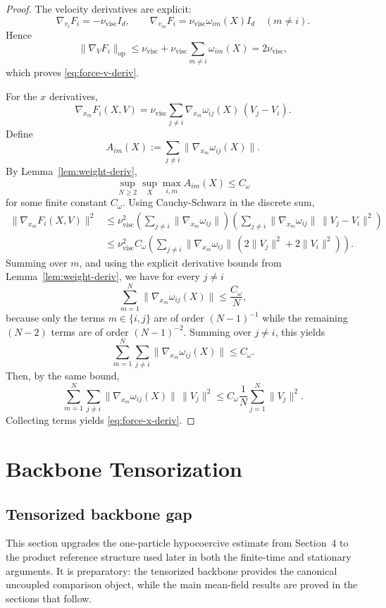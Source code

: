 \documentclass[11pt]{article}
\theoremstyle{definition}
\theoremstyle{remark}
\begin{document}
\begin{proof}
The velocity derivatives are explicit:
\[
\nabla_{v_i}F_i=-\nu_{\mathrm{visc}}I_d,
\qquad
\nabla_{v_m}F_i=
\nu_{\mathrm{visc}}\omega_{im}(X)I_d
\quad(m\neq i).
\]
Hence
\[
\|\nabla_V F_i\|_{\mathrm{op}}
\leq
\nu_{\mathrm{visc}}
+\nu_{\mathrm{visc}}\sum_{m\neq i}\omega_{im}(X)
=
2\nu_{\mathrm{visc}},
\]
which proves \eqref{eq:force-v-deriv}.

For the $x$ derivatives,
\[
\nabla_{x_m}F_i(X,V)
=
\nu_{\mathrm{visc}}\sum_{j\neq i}\nabla_{x_m}\omega_{ij}(X)\,(V_j-V_i).
\]
Define
\[
A_{im}(X):=\sum_{j\neq i}\|\nabla_{x_m}\omega_{ij}(X)\|.
\]
By Lemma~\ref{lem:weight-deriv},
\[
\sup_{N\geq2}\sup_X \max_{i,m} A_{im}(X)\leq C_\omega
\]
for some finite constant $C_\omega$. Using Cauchy-Schwarz in the discrete sum,
\begin{align*}
\|\nabla_{x_m}F_i(X,V)\|^2
&\leq
\nu_{\mathrm{visc}}^2
\left(\sum_{j\neq i}\|\nabla_{x_m}\omega_{ij}\|\right)
\left(\sum_{j\neq i}\|\nabla_{x_m}\omega_{ij}\|\,\|V_j-V_i\|^2\right)\\
&\leq
\nu_{\mathrm{visc}}^2 C_\omega
\left(\sum_{j\neq i}\|\nabla_{x_m}\omega_{ij}\|\,(2\|V_j\|^2+2\|V_i\|^2)\right).
\end{align*}
Summing over $m$, and using the explicit derivative bounds from
Lemma~\ref{lem:weight-deriv}, we have for every $j\neq i$
\[
\sum_{m=1}^N\|\nabla_{x_m}\omega_{ij}(X)\|
\leq
\frac{C_\omega}{N},
\]
because only the terms $m\in\{i,j\}$ are of order $(N-1)^{-1}$ while the
remaining $(N-2)$ terms are of order $(N-1)^{-2}$.
Summing over $j\neq i$, this yields
\[
\sum_{m=1}^N\sum_{j\neq i}\|\nabla_{x_m}\omega_{ij}(X)\|
\leq
C_\omega.
\]
Then, by the same bound,
\[
\sum_{m=1}^N\sum_{j\neq i}\|\nabla_{x_m}\omega_{ij}(X)\|\,\|V_j\|^2
\leq
C_\omega \frac1N\sum_{j=1}^N \|V_j\|^2.
\]
Collecting terms yields \eqref{eq:force-x-deriv}.
\end{proof}

\section{Backbone Tensorization}

\subsection{Tensorized backbone gap}

This section upgrades the one-particle hypocoercive estimate from
Section~4 to the product reference structure used later in both the
finite-time and stationary arguments. It is preparatory: the tensorized
backbone provides the canonical uncoupled comparison object, while the main
mean-field results are proved in the sections that follow.
\end{document}
